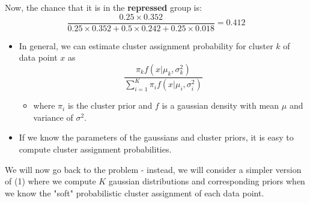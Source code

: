 \documentclass[10pt]{article}
\begin{document}
Now, the chance that it is in the \textbf{repressed} group is:
\[\frac{0.25 \times 0.352}{0.25 \times 0.352 + 0.5 \times 0.242 + 0.25 \times 0.018} = 0.412\]
\begin{itemize}
    \item In general, we can estimate cluster assignment probability for cluster $k$ of data point $x$ as
    \[\frac{\pi_k f(x | \mu_k, \sigma_k^2)}{\sum_{i = 1}^K \pi_i f(x|\mu_i, \sigma_i^2)}\]
    \begin{itemize}
        \item where $\pi_i$ is the cluster prior and $f$ is a gaussian density with mean $\mu$ and variance of $\sigma^2$.
    \end{itemize}
    \item If we know the parameters of the gaussians and cluster priors, it is easy to compute cluster assignment probabilities.
\end{itemize}
We will now go back to the problem - instead, we will consider a simpler version of (1) where we compute $K$ gaussian distributions and corresponding priors when we know the "soft" probabilistic cluster assignment of each data point.
\end{document}
